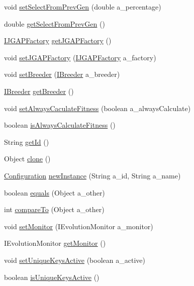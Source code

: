 \begin{DoxyCompactItemize}
\item 
void \hyperlink{classorg_1_1jgap_1_1_configuration_a84b66396a2e6d8a8845622a91b9d9c67}{set\-Select\-From\-Prev\-Gen} (double a\-\_\-percentage)
\item 
double \hyperlink{classorg_1_1jgap_1_1_configuration_a16caa58320da3d516365166c05948d82}{get\-Select\-From\-Prev\-Gen} ()
\item 
\hyperlink{interfaceorg_1_1jgap_1_1_i_j_g_a_p_factory}{I\-J\-G\-A\-P\-Factory} \hyperlink{classorg_1_1jgap_1_1_configuration_ad71c68a6972d6fd993197773439154a0}{get\-J\-G\-A\-P\-Factory} ()
\item 
void \hyperlink{classorg_1_1jgap_1_1_configuration_a73501a86949a183a900508c5716d19b5}{set\-J\-G\-A\-P\-Factory} (\hyperlink{interfaceorg_1_1jgap_1_1_i_j_g_a_p_factory}{I\-J\-G\-A\-P\-Factory} a\-\_\-factory)
\item 
void \hyperlink{classorg_1_1jgap_1_1_configuration_a5cdda5952f7d1746c078589ac57067ec}{set\-Breeder} (\hyperlink{interfaceorg_1_1jgap_1_1_i_breeder}{I\-Breeder} a\-\_\-breeder)
\item 
\hyperlink{interfaceorg_1_1jgap_1_1_i_breeder}{I\-Breeder} \hyperlink{classorg_1_1jgap_1_1_configuration_ab05ee6fe5e8a8b2c1fa46031817c7686}{get\-Breeder} ()
\item 
void \hyperlink{classorg_1_1jgap_1_1_configuration_aaf039a30f6acd205c83571394a18429b}{set\-Always\-Caculate\-Fitness} (boolean a\-\_\-always\-Calculate)
\item 
boolean \hyperlink{classorg_1_1jgap_1_1_configuration_ab65cde8101f15ba879c74c0e3421998f}{is\-Always\-Calculate\-Fitness} ()
\item 
String \hyperlink{classorg_1_1jgap_1_1_configuration_a7083c3b44f54ef4d4e16bf133d3af816}{get\-Id} ()
\item 
Object \hyperlink{classorg_1_1jgap_1_1_configuration_a90cdebd6682f5f84e9bf18952242c16e}{clone} ()
\item 
\hyperlink{classorg_1_1jgap_1_1_configuration}{Configuration} \hyperlink{classorg_1_1jgap_1_1_configuration_a25b74c8bdc70a3b88d6d4080a00f1f29}{new\-Instance} (String a\-\_\-id, String a\-\_\-name)
\item 
boolean \hyperlink{classorg_1_1jgap_1_1_configuration_a0370c988610ef6abc65deff9ded635a5}{equals} (Object a\-\_\-other)
\item 
int \hyperlink{classorg_1_1jgap_1_1_configuration_a4a2aca088bf17803c9803a915aca15fe}{compare\-To} (Object a\-\_\-other)
\item 
void \hyperlink{classorg_1_1jgap_1_1_configuration_a836ee94d0df06bf651d4d5d9dfddf4ae}{set\-Monitor} (I\-Evolution\-Monitor a\-\_\-monitor)
\item 
I\-Evolution\-Monitor \hyperlink{classorg_1_1jgap_1_1_configuration_a2a97d88e59502128a5378db14c11c734}{get\-Monitor} ()
\item 
void \hyperlink{classorg_1_1jgap_1_1_configuration_a8a2ec4027e2f753577d81ab5ee238a84}{set\-Unique\-Keys\-Active} (boolean a\-\_\-active)
\item 
boolean \hyperlink{classorg_1_1jgap_1_1_configuration_a1cbe9f50b9017fe15ac4e27487cc549f}{is\-Unique\-Keys\-Active} ()
\end{DoxyCompactItemize}
